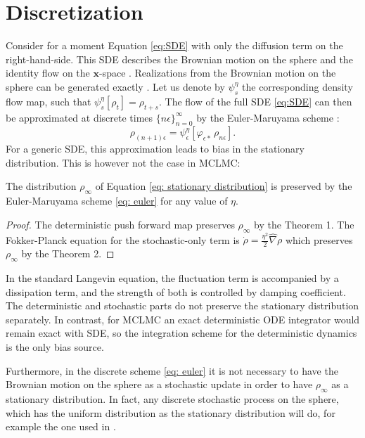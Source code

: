 \documentclass[tablecaption=bottom,wcp]{jmlr} %
\newcommand{\x}{\boldsymbol{x}}
\begin{document}
\section{Discretization}
Consider for a moment Equation \eqref{eq:SDE} with only the diffusion term on the right-hand-side. This SDE describes the Brownian motion on the sphere and the identity flow on the $\x$-space \citep{elworthyShort}. Realizations from the Brownian motion on the sphere can be generated exactly \citep{BrownianSphere}. Let us denote by $\psi^{\eta}_s$ the corresponding density flow map, such that $\psi^{\eta}_s[\rho_t] = \rho_{t+s}$.  
The flow of the full SDE \eqref{eq:SDE} can then be approximated at discrete times $\{ n \epsilon\}_{n = 0}^{\infty}$ by the Euler-Maruyama scheme \citep{SDEbook}:
\begin{equation} \label{eq: euler}
    \rho_{(n+1) \epsilon} = \psi^{\eta}_{\epsilon}[\varphi_{\epsilon *} \,\rho_{n \epsilon}].
\end{equation}
For a generic SDE, this approximation leads to bias in the stationary distribution. This is however not the case in MCLMC:

\begin{theorem}
The distribution $\rho_{\infty}$ of Equation \eqref{eq: stationary distribution} is preserved by the Euler-Maruyama scheme \eqref{eq: euler} for any value of $\eta$.
\end{theorem}

\begin{proof}
The deterministic push forward map preserves $\rho_{\infty}$ by the Theorem 1. The Fokker-Planck equation for the stochastic-only term is $\dot{\rho} = \frac{\eta^2}{2} \widehat{\nabla} \rho$ which preserves $\rho_{\infty}$ by the Theorem 2.
\end{proof}

In the standard Langevin equation, 
the fluctuation term is accompanied by a dissipation term, and the strength of both is controlled by damping coefficient. The deterministic and stochastic parts do not preserve the stationary distribution separately. In contrast, for MCLMC an 
exact deterministic ODE integrator would remain exact with SDE, so the integration scheme for the deterministic dynamics is the only bias source.

Furthermore, in the discrete scheme \eqref{eq: euler} it is not necessary to have the Brownian motion on the sphere as a stochastic update in order to have $\rho_{\infty}$ as a stationary distribution. In fact, any discrete stochastic process on the sphere, which has the uniform distribution as the stationary distribution will do, for example the one used in \cite{MCHMC}.
\end{document}
